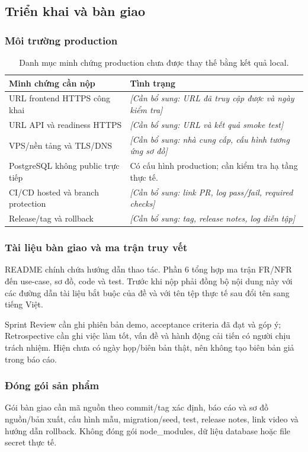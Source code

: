 \documentclass[12pt,a4paper]{article}
\newcommand{\canbosung}[1]{\textit{[Cần bổ sung: #1]}}
\begin{document}
\subsection{Triển khai và bàn giao}
\subsubsection{Môi trường production}
\begin{table}[H]\centering\small
\begin{tabularx}{\textwidth}{P{5.0cm}Y}
\toprule\textbf{Minh chứng cần nộp}&\textbf{Tình trạng}\\\midrule
URL frontend HTTPS công khai&\canbosung{URL đã truy cập được và ngày kiểm tra}\\
URL API và readiness HTTPS&\canbosung{URL và kết quả smoke test}\\
VPS/nền tảng và TLS/DNS&\canbosung{nhà cung cấp, cấu hình tương ứng sơ đồ}\\
PostgreSQL không public trực tiếp&Có cấu hình production; cần kiểm tra hạ tầng thực tế.\\
CI/CD hosted và branch protection&\canbosung{link PR, log pass/fail, required checks}\\
Release/tag và rollback&\canbosung{tag, release notes, log diễn tập}\\
\bottomrule\end{tabularx}\caption{Danh mục minh chứng production chưa được thay thế bằng kết quả local.}
\end{table}

\subsubsection{Tài liệu bàn giao và ma trận truy vết}
README chính chứa hướng dẫn thao tác. Phần 6 tổng hợp ma trận FR/NFR đến use-case, sơ đồ, code và test. Trước khi nộp phải đồng bộ nội dung này với các đường dẫn tài liệu bắt buộc của đề và với tên tệp thực tế sau đổi tên sang tiếng Việt.

Sprint Review cần ghi phiên bản demo, acceptance criteria đã đạt và góp ý; Retrospective cần ghi việc làm tốt, vấn đề và hành động cải tiến có người chịu trách nhiệm. Hiện chưa có ngày họp/biên bản thật, nên không tạo biên bản giả trong báo cáo.

\subsubsection{Đóng gói sản phẩm}
Gói bàn giao cần mã nguồn theo commit/tag xác định, báo cáo và sơ đồ nguồn/bản xuất, cấu hình mẫu, migration/seed, test, release notes, link video và hướng dẫn rollback. Không đóng gói node\_modules, dữ liệu database hoặc file secret thực tế.
\end{document}
